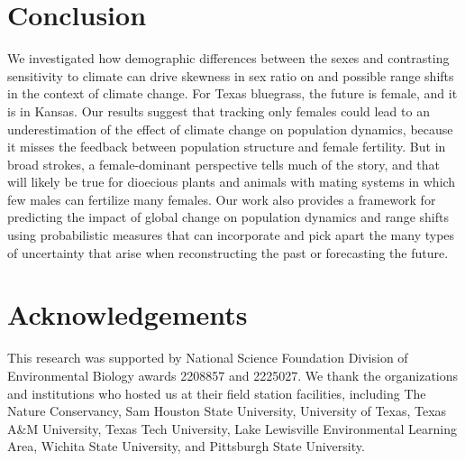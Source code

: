 \documentclass[12pt]{article}\usepackage[]{graphicx}\usepackage[dvipsnames]{xcolor}
\begin{document}

\section*{Conclusion}
We investigated how demographic differences between the sexes and contrasting sensitivity to climate can drive skewness in sex ratio on and possible range shifts in the context of climate change. 
For Texas bluegrass, the future is female, and it is in Kansas. 
Our results suggest that tracking only females could lead to an underestimation of the effect of climate change on population dynamics, because it misses the feedback between population structure and female fertility. 
But in broad strokes, a female-dominant perspective tells much of the story, and that will likely be true for dioecious plants and animals with mating systems in which few males can fertilize many females. 
Our work also provides a framework for predicting the impact of global change on population dynamics and range shifts using probabilistic measures that can incorporate and pick apart the many types of uncertainty that arise when reconstructing the past or forecasting the future. 

\section*{Acknowledgements}
This research was supported by National Science Foundation Division of Environmental Biology awards 2208857 and 2225027. 
We thank the organizations and institutions who hosted us at their field station facilities, including The Nature Conservancy, Sam Houston State University, University of Texas, Texas A\&M University, Texas Tech University, Lake Lewisville Environmental Learning Area, Wichita State University, and Pittsburgh State University. 
\end{document}
